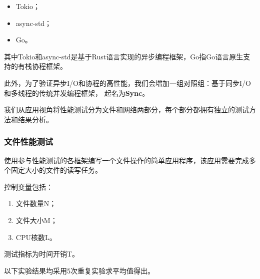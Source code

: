 \documentclass[supercite]{HustGraduPaper}
\theoremstyle{definition}
\begin{document}
\begin{itemize}
  \item Tokio；
  \item async-std；
  \item Go。
\end{itemize}

其中Tokio和async-std是基于Rust语言实现的异步编程框架，Go指Go语言原生支持的有栈协程框架。\par

此外，为了验证异步I/O和协程的高性能，我们会增加一组对照组：基于同步I/O和多线程的传统并发编程框架，
起名为\textbf{Sync}。\par

我们从应用视角将性能测试分为文件和网络两部分，每个部分都拥有独立的测试方法和结果分析。\par

\subsubsection{文件性能测试}


使用参与性能测试的各框架编写一个文件操作的简单应用程序，该应用需要完成多个固定大小的文件的读写任务。\par

控制变量包括：

\begin{enumerate}
  \item 文件数量N；
  \item 文件大小M；
  \item CPU核数L。
\end{enumerate}

测试指标为时间开销T。\par

以下实验结果均采用5次重复实验求平均值得出。\par
\end{document}
